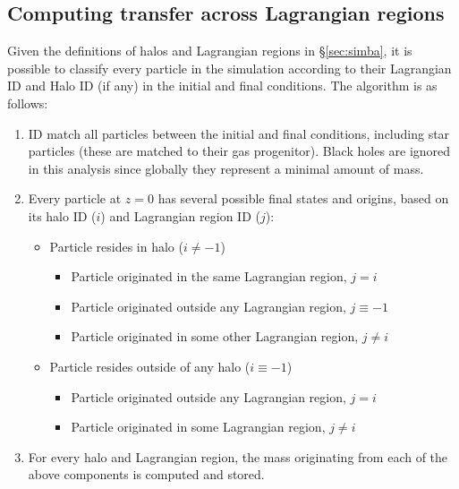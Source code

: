 \subsection{Computing transfer across Lagrangian regions}

Given the definitions of halos and Lagrangian regions in \S\ref{sec:simba}, it is possible to classify every particle in the simulation according to their Lagrangian ID and Halo ID (if any) in the initial and final conditions.
The algorithm is as follows:

\begin{enumerate}
	\item ID match all particles between the initial and final conditions, including
	      star particles (these are matched to their gas progenitor). Black holes are ignored in this analysis since globally they represent a minimal amount of mass.

	\item Every particle at $z=0$ has several possible final states and origins, based on its halo ID ($i$) and Lagrangian region ID ($j$):
	      \begin{itemize}
	            \item Particle resides in  halo ($i \neq -1$)
	            \begin{itemize}
	           		\item Particle originated in the same Lagrangian region, $j = i$
	           		\item Particle originated outside any Lagrangian region, $j \equiv -1$
	           		\item Particle originated in some other Lagrangian region, $j \neq i$
	            \end{itemize}
	            \item Particle resides outside of any halo ($i \equiv -1$)
	            \begin{itemize}
	            	\item %
	            	Particle originated outside any Lagrangian region, $j = i$
	            	\item Particle originated in some Lagrangian region, $j \neq i$
	            \end{itemize}
	      \end{itemize}
	      
	\item For every halo and Lagrangian region, the mass originating from each
	      of the above components is computed and stored.
\end{enumerate}

